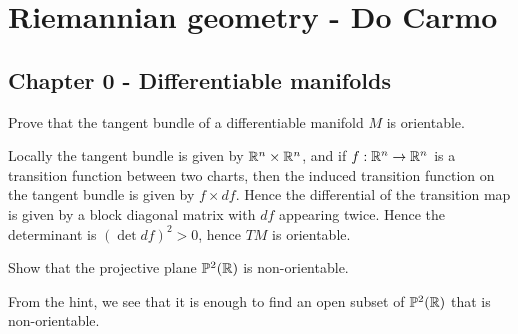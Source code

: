\documentclass[11pt, english]{article}
\begin{document}
\section{Riemannian geometry - Do Carmo}

\subsection{Chapter 0 - Differentiable manifolds}

\begin{exc}[Excercise 2]
 Prove that the tangent bundle of a differentiable manifold $M$ is orientable.
\end{exc}
\begin{sol}
Locally the tangent bundle is given by $\mathbb{R}^n \times \mathbb{R}^n$, and if $f:\mathbb{R}^n \to \mathbb{R}^n$ is a transition function between two charts, then the induced transition function on the tangent bundle is given by $f \times df$. Hence the differential of the transition map is given by a block diagonal matrix with $df$ appearing twice. Hence the determinant is $(\det df)^2 > 0$, hence $TM$ is orientable.
\end{sol}

\begin{exc}[Exercise 4]
  Show that the projective plane $\mathbb{P}^2(\mathbb{R})$ is non-orientable.
\end{exc}
\begin{sol}
  From the hint, we see that it is enough to find an open subset of $\mathbb{P}^2(\mathbb{R})$ that is non-orientable. 
\end{sol}
\end{document}
